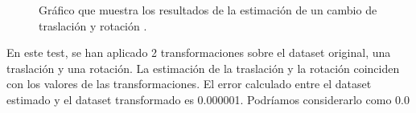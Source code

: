 \begin{figure}[H]
\begin{center}
\hspace{0.5cm}

\end{center}

\caption{Gráfico que muestra los resultados de la estimación de un cambio de traslación y rotación .}
\end{figure}

En este test, se han aplicado 2 transformaciones sobre el dataset original, una traslación y una rotación.
La estimación de la traslación y la rotación coinciden con los valores de las transformaciones. El error calculado entre el dataset estimado y el dataset transformado es 0.000001.
Podríamos considerarlo como 0.0



